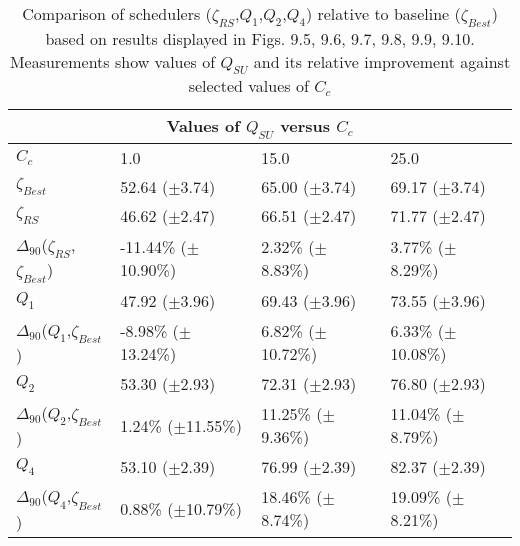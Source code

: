 \clearpage
\begin{landscape}
\begin{table}[h]
\begin{center}
\begin{tabular}{llll}
\toprule
\multicolumn{4}{c}{Values of $Q_{SU}$ versus $C_c$}\\
\midrule
$C_c$ & 1.0 & 15.0 & 25.0\\
\midrule
$\zeta_{Best}$ &  52.64 ($\pm$3.74) &  65.00 ($\pm$3.74) &  69.17 ($\pm$3.74)\\
\midrule
$\zeta_{RS}$ &  46.62 ($\pm$2.47) &  66.51 ($\pm$2.47) &  71.77 ($\pm$2.47)\\
$\Delta_{90}$($\zeta_{RS}$,$\zeta_{Best}$) & -11.44\% ($\pm$10.90\%) & 2.32\% ($\pm$8.83\%) & 3.77\% ($\pm$8.29\%)\\
$Q_1$ &  47.92 ($\pm$3.96) &  69.43 ($\pm$3.96) &  73.55 ($\pm$3.96)\\
$\Delta_{90}$($Q_1$,$\zeta_{Best}$) & -8.98\% ($\pm$13.24\%) & 6.82\% ($\pm$10.72\%) & 6.33\% ($\pm$10.08\%)\\
$Q_2$ &  53.30 ($\pm$2.93) &  72.31 ($\pm$2.93) &  76.80 ($\pm$2.93)\\
$\Delta_{90}$($Q_2$,$\zeta_{Best}$) & 1.24\% ($\pm$11.55\%) & 11.25\% ($\pm$9.36\%) & 11.04\% ($\pm$8.79\%)\\
$Q_4$ &  53.10 ($\pm$2.39) &  76.99 ($\pm$2.39) &  82.37 ($\pm$2.39)\\
$\Delta_{90}$($Q_4$,$\zeta_{Best}$) & 0.88\% ($\pm$10.79\%) & 18.46\% ($\pm$8.74\%) & 19.09\% ($\pm$8.21\%)\\
\bottomrule
\end{tabular}
\end{center}
\caption[Comparison of $Q_{SU}$ versus $C_c$ for $\zeta_{RS}$,$Q_1$,$Q_2$,$Q_4$ relative to $\zeta_{Best}$.]{Comparison of schedulers ($\zeta_{RS}$,$Q_1$,$Q_2$,$Q_4$) relative to baseline ($\zeta_{Best}$) based on results displayed in Figs. 9.5, 9.6, 9.7, 9.8, 9.9, 9.10. Measurements show values of $Q_{SU}$ and its relative improvement against selected values of $C_c$}
\label{b:f95}
\end{table}
\end{landscape}


